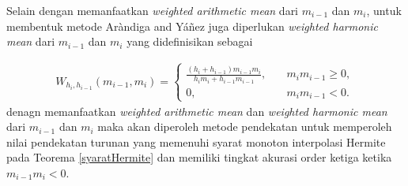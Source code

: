 


Selain dengan memanfaatkan \textit{weighted arithmetic mean} dari $m_{i-1}$ dan $m_i$, untuk membentuk metode Aràndiga and Yáñez juga diperlukan \textit{weighted harmonic mean} dari $m_{i-1}$ dan $m_i$ yang didefinisikan sebagai

\begin{align*}
     W_{h_i,h_{i-1}}(m_{i-1},m_i) = \begin{cases}
        \frac{(h_i + h_{i-1})m_{i-1}m_i}{h_im_i + h_{i-1}m_{i-1}}, \quad & m_{i}m_{i-1} \geq 0, \\
        0, \quad & m_im_{i-1} < 0.
    \end{cases}
\end{align*}
denagn memanfaatkan \textit{weighted arithmetic mean} dan \textit{weighted harmonic mean} dari $m_{i-1}$ dan $m_i$ maka akan diperoleh metode pendekatan untuk memperoleh nilai pendekatan turunan yang memenuhi syarat monoton interpolasi Hermite pada Teorema \ref{syaratHermite} dan memiliki tingkat akurasi order ketiga ketika $m_{i-1}m_{i} < 0$.  




